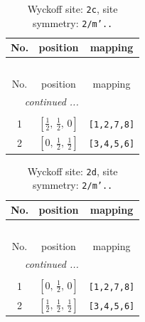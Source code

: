 \documentclass[fleqn,8pt]{jsarticle}
\begin{document}
\begin{longtable}{ccc}
\caption{Wyckoff site: {\tt 2c}, site symmetry: {\tt 2/m'..}}
 \\
 \hline \hline
No. & position & mapping \\ \hline \endfirsthead

\multicolumn{2}{l}{\tablename\ \thetable{}} \\
 \hline \hline
No. & position & mapping \\ \hline \endhead

 \hline \hline
\multicolumn{2}{r}{\footnotesize\it continued ...} \\ \endfoot

 \hline \hline
\multicolumn{2}{r}{} \\ \endlastfoot

1 & $\left[ \frac{1}{2},\, \frac{1}{2},\, 0 \right]$ & {\tt [1,2,7,8]} \\ \hline
2 & $\left[ 0,\, \frac{1}{2},\, \frac{1}{2} \right]$ & {\tt [3,4,5,6]} \\
\end{longtable}
\renewcommand{\arraystretch}{1.2}
\begin{longtable}{ccc}
\caption{Wyckoff site: {\tt 2d}, site symmetry: {\tt 2/m'..}}
 \\
 \hline \hline
No. & position & mapping \\ \hline \endfirsthead

\multicolumn{2}{l}{\tablename\ \thetable{}} \\
 \hline \hline
No. & position & mapping \\ \hline \endhead

 \hline \hline
\multicolumn{2}{r}{\footnotesize\it continued ...} \\ \endfoot

 \hline \hline
\multicolumn{2}{r}{} \\ \endlastfoot

1 & $\left[ 0,\, \frac{1}{2},\, 0 \right]$ & {\tt [1,2,7,8]} \\ \hline
2 & $\left[ \frac{1}{2},\, \frac{1}{2},\, \frac{1}{2} \right]$ & {\tt [3,4,5,6]} \\
\end{longtable}
\renewcommand{\arraystretch}{1.2}
\end{document}
